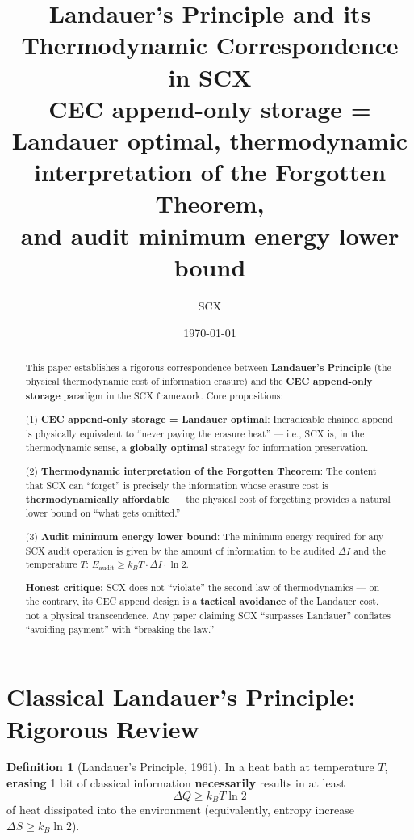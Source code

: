 \documentclass[12pt,a4paper]{article}
\title{\textbf{Landauer's Principle and its Thermodynamic Correspondence in SCX}\\[0.3em]
       \large CEC append-only storage = Landauer optimal, thermodynamic interpretation of the Forgotten Theorem, \\ and audit minimum energy lower bound}
\author{SCX}
\date{\today}
\theoremstyle{plain}
\theoremstyle{definition}
\newtheorem{definition}[theorem]{Definition}
\newcommand{\kB}{k_{\!B}}
\begin{document}
\maketitle

\begin{abstract}
This paper establishes a rigorous correspondence between \textbf{Landauer's Principle} (the physical thermodynamic cost of information erasure) and the \textbf{CEC append-only storage} paradigm in the SCX framework. Core propositions:

(1) \textbf{CEC append-only storage = Landauer optimal}: Ineradicable chained append is physically equivalent to ``never paying the erasure heat'' --- i.e., SCX is, in the thermodynamic sense, a \textbf{globally optimal} strategy for information preservation.

(2) \textbf{Thermodynamic interpretation of the Forgotten Theorem}: The content that SCX can ``forget'' is precisely the information whose erasure cost is \textbf{thermodynamically affordable} --- the physical cost of forgetting provides a natural lower bound on ``what gets omitted.''

(3) \textbf{Audit minimum energy lower bound}: The minimum energy required for any SCX audit operation is given by the amount of information to be audited $\Delta I$ and the temperature $T$: $E_{\text{audit}} \geq \kB T \cdot \Delta I \cdot \ln 2$.

\textbf{Honest critique:} SCX does not ``violate'' the second law of thermodynamics --- on the contrary, its CEC append design is a \textbf{tactical avoidance} of the Landauer cost, not a physical transcendence. Any paper claiming SCX ``surpasses Landauer'' conflates ``avoiding payment'' with ``breaking the law.''
\end{abstract}

\tableofcontents

\section{Classical Landauer's Principle: Rigorous Review}
\label{sec:landauer_classic}

\begin{definition}[Landauer's Principle, 1961]
\label{def:landauer}
In a heat bath at temperature $T$, \textbf{erasing} 1 bit of classical information \textbf{necessarily} results in at least
\begin{equation}\label{eq:landauer_classic}
\Delta Q \geq \kB T \ln 2
\end{equation}
of heat dissipated into the environment (equivalently, entropy increase $\Delta S \geq \kB \ln 2$).
\end{definition}
\end{document}
